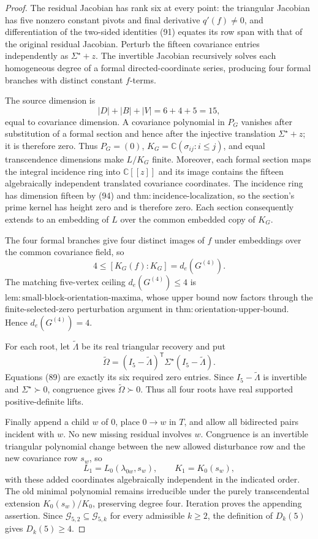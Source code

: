 \documentclass{article}
\begin{document}
\begin{proof}
The residual Jacobian has rank six at every point: the triangular Jacobian has five nonzero constant pivots and final derivative \(q'(f)\ne0\), and differentiation of the two-sided identities (91) equates its row span with that of the original residual Jacobian.  Perturb the fifteen covariance entries independently as \(\Sigma^{\star}+z\).  The invertible Jacobian recursively solves each homogeneous degree of a formal directed-coordinate series, producing four formal branches with distinct constant \(f\)-terms.

The source dimension is
\[
 |D|+|B|+|V|=6+4+5=15,
\tag{94}
\]
equal to covariance dimension.  A covariance polynomial in \(P_G\) vanishes after substitution of a formal section and hence after the injective translation \(\Sigma^{\star}+z\); it is therefore zero.  Thus \(P_G=(0)\), \(K_G=\mathbb C(\sigma_{ij}:i\le j)\), and equal transcendence dimensions make \(L/K_G\) finite.  Moreover, each formal section maps the integral incidence ring into \(\mathbb C[[z]]\) and its image contains the fifteen algebraically independent translated covariance coordinates.  The incidence ring has dimension fifteen by (94) and \(\mathrm{thm:incidence\mbox{-}localization}\), so the section's prime kernel has height zero and is therefore zero.  Each section consequently extends to an embedding of \(L\) over the common embedded copy of \(K_G\).

The four formal branches give four distinct images of \(f\) under embeddings over the common covariance field, so
\[
 4\leq[K_G(f):K_G]=d_e(G^{(4)}).
\tag{95}
\]
The matching five-vertex ceiling \(d_e(G^{(4)})\leq4\) is \(\mathrm{lem:small\mbox{-}block\mbox{-}orientation\mbox{-}maxima}\), whose upper bound now factors through the finite-selected-zero perturbation argument in \(\mathrm{thm:orientation\mbox{-}upper\mbox{-}bound}\). Hence \(d_e(G^{(4)})=4\).

For each root, let \(\widetilde\Lambda\) be its real triangular recovery and put
\[
 \widetilde\Omega=(I_5-\widetilde\Lambda)^{\mathsf T}
 \Sigma^{\star}(I_5-\widetilde\Lambda).
\]
Equations (89) are exactly its six required zero entries.  Since \(I_5-\widetilde\Lambda\) is invertible and \(\Sigma^{\star}\succ0\), congruence gives \(\widetilde\Omega\succ0\).  Thus all four roots have real supported positive-definite lifts.

Finally append a child \(w\) of \(0\), place \(0\to w\) in \(T\), and allow all bidirected pairs incident with \(w\).  No new missing residual involves \(w\).  Congruence is an invertible triangular polynomial change between the new allowed disturbance row and the new covariance row \(s_w\), so
\[
 L_1=L_0(\lambda_{0w},s_w),\qquad K_1=K_0(s_w),
\]
with these added coordinates algebraically independent in the indicated order.  The old minimal polynomial remains irreducible under the purely transcendental extension \(K_0(s_w)/K_0\), preserving degree four.  Iteration proves the appending assertion.  Since \(\mathcal G_{5,2}\subseteq\mathcal G_{5,k}\) for every admissible \(k\ge2\), the definition of \(D_k(5)\) gives \(D_k(5)\ge4\).
\end{proof}
\end{document}
